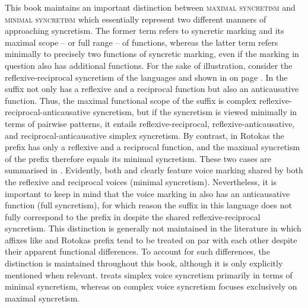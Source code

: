 This book maintains an important distinction between \textsc{maximal syncretism} and \textsc{minimal syncretism} which essentially represent two different manners of approaching syncretism. The former term refers to syncretic marking and its maximal scope -- or full range -- of functions, whereas the latter term refers minimally to precisely two functions of syncretic marking, even if the marking in question also has additional functions. For the sake of illustration, consider the reflexive-reciprocal syncretism of the languages  and  shown in  on page \pageref{tab:ch1:examples}. In  the suffix  not only has a reflexive and a reciprocal function but also an anticausative function. Thus, the maximal functional scope of the suffix  is complex reflexive-reciprocal-anticausative syncretism, but if the syncretism is viewed minimally in terms of pairwise patterns, it entails reflexive-reciprocal, reflexive-anticausative, and reciprocal-anticausative simplex syncretism. By contrast, in Rotokas the prefix  has only a reflexive and a reciprocal function, and the maximal syncretism of the prefix therefore equals its minimal syncretism. These two cases are summarised in . Evidently, both  and  clearly feature voice marking shared by both the reflexive and reciprocal voices (minimal syncretism). Nevertheless, it is important to keep in mind that the voice marking in  also has an anticausative function (full syncretism), for which reason the suffix  in this language does not fully correspond to the prefix  in  despite the shared reflexive-reciprocal syncretism. This distinction is generally not maintained in the literature in which affixes like   and Rotokas prefix  tend to be treated on par with each other despite their apparent functional differences. To account for such differences, the distinction is maintained throughout this book, although it is only explicitly mentioned when relevant.  treats simplex voice syncretism primarily in terms of minimal syncretism, whereas  on complex voice syncretism focuses exclusively on maximal syncretism.

